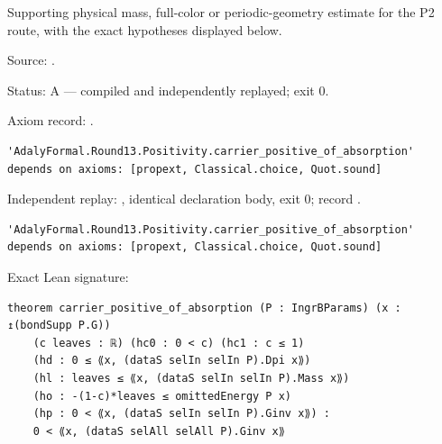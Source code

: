 \begin{theorem}[bp-456]
\label{bp-456}
\leanok
Supporting physical mass, full-color or periodic-geometry estimate for the P2 route, with the exact hypotheses displayed below.

\par Source: \texttt{}.
\par Status: A — compiled and independently replayed; exit 0.
\par Axiom record: \texttt{}.
\begin{verbatim}
'AdalyFormal.Round13.Positivity.carrier_positive_of_absorption' depends on axioms: [propext, Classical.choice, Quot.sound]
\end{verbatim}
\par Independent replay: \texttt{}, identical declaration body, exit 0; record \texttt{}.
\begin{verbatim}
'AdalyFormal.Round13.Positivity.carrier_positive_of_absorption' depends on axioms: [propext, Classical.choice, Quot.sound]
\end{verbatim}
\par Exact Lean signature:
\begin{verbatim}
theorem carrier_positive_of_absorption (P : IngrBParams) (x : ↥(bondSupp P.G))
    (c leaves : ℝ) (hc0 : 0 < c) (hc1 : c ≤ 1)
    (hd : 0 ≤ ⟪x, (dataS selIn selIn P).Dpi x⟫)
    (hl : leaves ≤ ⟪x, (dataS selIn selIn P).Mass x⟫)
    (ho : -(1-c)*leaves ≤ omittedEnergy P x)
    (hp : 0 < ⟪x, (dataS selIn selIn P).Ginv x⟫) :
    0 < ⟪x, (dataS selAll selAll P).Ginv x⟫
\end{verbatim}
\end{theorem}

